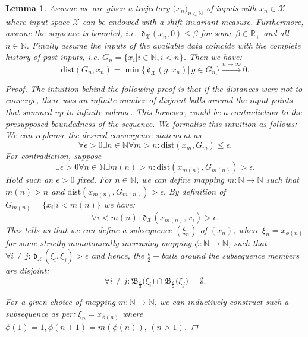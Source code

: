 \documentclass{article} %
\newtheorem{lem}[thm]{Lemma}
\theoremstyle{definition}
\theoremstyle{remark}
\newcommand{\Real}{\mathbb R}
\newcommand{\nat}{\mathbb N}
\newcommand{\vc}[1]{#1}
\newcommand{\ball}[2]{\ensuremath{\mathfrak B_{\vc{#1}} \bigl( #2\bigr) }}
\newcommand{\inspace}{\ensuremath{ \mathcal X}}
\newcommand{\metric}{\, \mathfrak{d}} %
\newcommand{\dist}{\ensuremath{ \text{dist}}} %
\newcommand{\seq}[2]{\ensuremath{\bigl(#1\bigr)_{#2}}}
\newcommand{\eqn}[2]{\begin{equation} #2 \label{#1}\end{equation}}
\begin{document}
\begin{lem} 
Assume we are given a trajectory $\seq{x_n}{n \in \nat}$ of inputs with $x_n \in \inspace$ where input space $\inspace$ can be endowed with a shift-invariant measure. Furthermore, assume the sequence  is bounded, i.e.  
$\metric_\inspace(x_n,0) \leq \beta$ for some $\beta \in \Real_+$ and all $n \in \nat$.
Finally assume the inputs of the available data coincide with the complete history of past inputs, i.e. $G_n = \{ x_i | i \in \nat, i < n\}$.
Then we have: \[ \dist(G_n,x_n) = \min\{\metric_\inspace(g,x_n) | \, g \in G_n\} \stackrel{n \to \infty}{\longrightarrow} 0.\]
\begin{proof}
The intuition behind the following proof is that if the distances were not to converge, there was an infinite number of disjoint balls around the input points that summed up to infinite volume. This however, would be a contradiction to the presupposed boundedness of the sequence.
We formalise this intuition as follows:
We can rephrase the desired convergence statement as 
\begin{equation}
\forall \epsilon > 0 \exists n \in \nat \forall m > n : \dist(x_{m}, G_{m}) \leq \epsilon.
\end{equation} 
For contradiction, suppose
\begin{equation}
\exists \epsilon > 0 \forall n \in \nat \exists m(n) > n : \dist(x_{m(n)}, G_{m(n)}) > \epsilon.
\end{equation} 
Hold such an $\epsilon >0$ fixed. For $n \in \nat$, we can define mapping $m: \nat \to \nat$ such that  $ m(n)>n$ and $  \dist(x_{m(n)}, G_{m(n)}) > \epsilon.$
By definition of $G_{m(n)} =\{ x_i | i < m(n)\} $ we have:
\eqn{eq:i34kjjk3}{\forall i < m(n) : \metric_\inspace(x_{m(n)},x_i) > \epsilon.}
This tells us that we can define a subsequence $(\xi_n)$ of $(x_n)$, where $\xi_n = x_{\phi(n)}$ for some strictly monotonically increasing mapping $\phi:\nat \to \nat$, such that 
$ \forall i \neq j: \metric_\inspace(\xi_i,\xi_j) > \epsilon$
and hence, the $\frac \epsilon 2 -$balls around the subsequence members are disjoint: $$\forall i \neq j: \ball{\frac \epsilon 2}{\xi_i}  \cap  \ball{\frac \epsilon 2}{\xi_j} = \emptyset.$$

For a given choice of mapping $m :\nat \to \nat$, we can inductively construct such a subsequence as per: $ \xi_{n} = x_{\phi(n)}$ where $\phi(1) = 1, \phi(n+1) = m(\phi(n)), \, (n>1)$.





\end{proof}
\end{lem}
\end{document}
